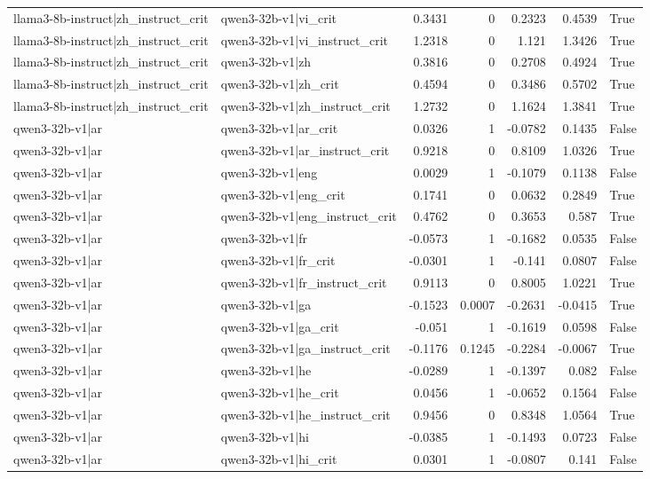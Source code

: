 \begin{table}
\begin{tabular}{l l r r r r l}
llama3-8b-instruct|zh_instruct_crit & qwen3-32b-v1|vi_crit & 0.3431 & 0 & 0.2323 & 0.4539 & True \\
llama3-8b-instruct|zh_instruct_crit & qwen3-32b-v1|vi_instruct_crit & 1.2318 & 0 & 1.121 & 1.3426 & True \\
llama3-8b-instruct|zh_instruct_crit & qwen3-32b-v1|zh & 0.3816 & 0 & 0.2708 & 0.4924 & True \\
llama3-8b-instruct|zh_instruct_crit & qwen3-32b-v1|zh_crit & 0.4594 & 0 & 0.3486 & 0.5702 & True \\
llama3-8b-instruct|zh_instruct_crit & qwen3-32b-v1|zh_instruct_crit & 1.2732 & 0 & 1.1624 & 1.3841 & True \\
qwen3-32b-v1|ar & qwen3-32b-v1|ar_crit & 0.0326 & 1 & -0.0782 & 0.1435 & False \\
qwen3-32b-v1|ar & qwen3-32b-v1|ar_instruct_crit & 0.9218 & 0 & 0.8109 & 1.0326 & True \\
qwen3-32b-v1|ar & qwen3-32b-v1|eng & 0.0029 & 1 & -0.1079 & 0.1138 & False \\
qwen3-32b-v1|ar & qwen3-32b-v1|eng_crit & 0.1741 & 0 & 0.0632 & 0.2849 & True \\
qwen3-32b-v1|ar & qwen3-32b-v1|eng_instruct_crit & 0.4762 & 0 & 0.3653 & 0.587 & True \\
qwen3-32b-v1|ar & qwen3-32b-v1|fr & -0.0573 & 1 & -0.1682 & 0.0535 & False \\
qwen3-32b-v1|ar & qwen3-32b-v1|fr_crit & -0.0301 & 1 & -0.141 & 0.0807 & False \\
qwen3-32b-v1|ar & qwen3-32b-v1|fr_instruct_crit & 0.9113 & 0 & 0.8005 & 1.0221 & True \\
qwen3-32b-v1|ar & qwen3-32b-v1|ga & -0.1523 & 0.0007 & -0.2631 & -0.0415 & True \\
qwen3-32b-v1|ar & qwen3-32b-v1|ga_crit & -0.051 & 1 & -0.1619 & 0.0598 & False \\
qwen3-32b-v1|ar & qwen3-32b-v1|ga_instruct_crit & -0.1176 & 0.1245 & -0.2284 & -0.0067 & True \\
qwen3-32b-v1|ar & qwen3-32b-v1|he & -0.0289 & 1 & -0.1397 & 0.082 & False \\
qwen3-32b-v1|ar & qwen3-32b-v1|he_crit & 0.0456 & 1 & -0.0652 & 0.1564 & False \\
qwen3-32b-v1|ar & qwen3-32b-v1|he_instruct_crit & 0.9456 & 0 & 0.8348 & 1.0564 & True \\
qwen3-32b-v1|ar & qwen3-32b-v1|hi & -0.0385 & 1 & -0.1493 & 0.0723 & False \\
qwen3-32b-v1|ar & qwen3-32b-v1|hi_crit & 0.0301 & 1 & -0.0807 & 0.141 & False \\

\end{tabular}
\end{table}
